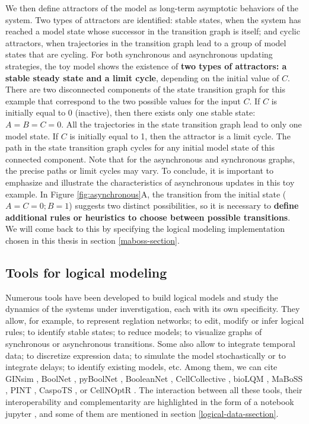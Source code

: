 \documentclass[a4paper,12pt,twoside,onecolumn,openright,final,oldfontcommands]{memoir}
\begin{document}
We then define attractors of the model as long-term asymptotic behaviors
of the system. Two types of attractors are identified: stable states,
when the system has reached a model state whose successor in the
transition graph is itself; and cyclic attractors, when trajectories in
the transition graph lead to a group of model states that are cycling.
For both synchronous and asynchronous updating strategies, the toy model
shows the existence of \textbf{two types of attractors: a stable steady
state and a limit cycle}, depending on the initial value of \(C\). There
are two disconnected components of the state transition graph for this
example that correspond to the two possible values for the input \(C\).
If \(C\) is initially equal to 0 (inactive), then there exists only one
stable state: \(A=B=C=0\). All the trajectories in the state transition
graph lead to only one model state. If \(C\) is initially equal to 1,
then the attractor is a limit cycle. The path in the state transition
graph cycles for any initial model state of this connected component.
Note that for the asynchronous and synchronous graphs, the precise paths
or limit cycles may vary. To conclude, it is important to emphasize and
illustrate the characteristics of asynchronous updates in this toy
example. In Figure \ref{fig:asynchronous}A, the transition from the
initial state (\(A=C=0;B=1\)) suggests two distinct possibilities, so it
is necessary to \textbf{define additional rules or heuristics to choose
between possible transitions}. We will come back to this by specifying
the logical modeling implementation chosen in this thesis in section
\ref{maboss-section}.

\subsection{Tools for logical
modeling}\label{tools-for-logical-modeling}

Numerous tools have been developed to build logical models and study the
dynamics of the systems under inverstigation, each with its own
specificity. They allow, for example, to represent reglation networks;
to edit, modify or infer logical rules; to identify stable states; to
reduce models; to visualize graphs of synchronous or asynchronous
transitions. Some also allow to integrate temporal data; to discretize
expression data; to simulate the model stochastically or to integrate
delays; to identify existing models, etc. Among them, we can cite GINsim
\citep{naldi2018logical}, BoolNet \citep{mussel2010boolnet}, pyBoolNet
\citep{klarner2016pyboolnet}, BooleanNet \citep{albert2008boolean},
CellCollective \citep{helikar2012cell}, bioLQM \citep{naldi2018biolqm},
MaBoSS \citep{stoll2012continuous, stoll2017maboss}, PINT \citep{Pint},
CaspoTS \citep{ostrowski2016boolean}, or CellNOptR
\citep{terfve2012cellnoptr}. The interaction between all these tools,
their interoperability and complementarity are highlighted in the form
of a notebook jupyter \citep{naldi2018colomoto}, and some of them are
mentioned in section \ref{logical-data-ssection}.
\end{document}

